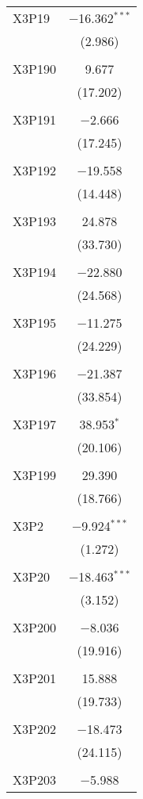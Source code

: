 \begin{table}[!htbp]
\begin{tabular}{@{\extracolsep{5pt}}lc}
 X3P19 & $-$16.362$^{***}$ \\ 
  & (2.986) \\ 
  & \\ 
 X3P190 & 9.677 \\ 
  & (17.202) \\ 
  & \\ 
 X3P191 & $-$2.666 \\ 
  & (17.245) \\ 
  & \\ 
 X3P192 & $-$19.558 \\ 
  & (14.448) \\ 
  & \\ 
 X3P193 & 24.878 \\ 
  & (33.730) \\ 
  & \\ 
 X3P194 & $-$22.880 \\ 
  & (24.568) \\ 
  & \\ 
 X3P195 & $-$11.275 \\ 
  & (24.229) \\ 
  & \\ 
 X3P196 & $-$21.387 \\ 
  & (33.854) \\ 
  & \\ 
 X3P197 & 38.953$^{*}$ \\ 
  & (20.106) \\ 
  & \\ 
 X3P199 & 29.390 \\ 
  & (18.766) \\ 
  & \\ 
 X3P2 & $-$9.924$^{***}$ \\ 
  & (1.272) \\ 
  & \\ 
 X3P20 & $-$18.463$^{***}$ \\ 
  & (3.152) \\ 
  & \\ 
 X3P200 & $-$8.036 \\ 
  & (19.916) \\ 
  & \\ 
 X3P201 & 15.888 \\ 
  & (19.733) \\ 
  & \\ 
 X3P202 & $-$18.473 \\ 
  & (24.115) \\ 
  & \\ 
 X3P203 & $-$5.988 \\ 

\end{tabular}
\end{table}
